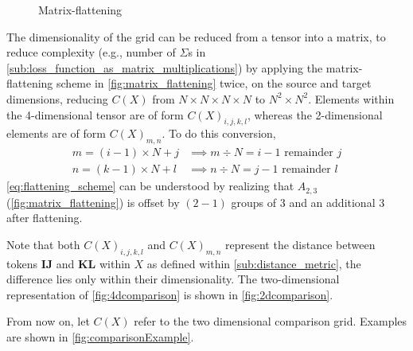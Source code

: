 \begin{figure}[htpb]
    \centering
    \caption{Matrix-flattening}%
    \label{fig:matrix_flattening}
\end{figure}
The dimensionality of the grid can be reduced from a tensor into a matrix, to reduce complexity (e.g., number of $\Sigma$s in \ref{sub:loss_function_as_matrix_multiplications}) by applying the matrix-flattening scheme in \autoref{fig:matrix_flattening} twice, on the source and target dimensions, reducing $C(X)$ from $N\times N\times N\times N$ to $N^2\times N^2$. Elements within the 4-dimensional tensor are of form $C(X)_{i,j,k,l}$, whereas the 2-dimensional elements are of form $C(X)_{m,n}$. To do this conversion,%
\begin{align}
    m=(i-1)\times N+j &\implies m\div N=i-1 \text{ remainder } j\nonumber\\
    n=(k-1)\times N+l &\implies n\div N=j-1 \text{ remainder } l
    \label{eq:flattening_scheme}
\end{align}
\autoref{eq:flattening_scheme} can be understood by realizing that $A_{2,3}$ (\autoref{fig:matrix_flattening}) is offset by $(2-1)$ groups of 3 and an additional 3 after flattening.

Note that both $C(X)_{i,j,k,l}$ and $C(X)_{m,n}$ represent the distance between tokens $\bm{IJ}$ and $\bm{KL}$ within $X$ as defined within \autoref{sub:distance_metric}, the difference lies only within their dimensionality. The two-dimensional representation of \autoref{fig:4dcomparison} is shown in \autoref{fig:2dcomparison}.

From now on, let $C(X)$ refer to the two dimensional comparison grid. Examples are shown in \autoref{fig:comparisonExample}.

